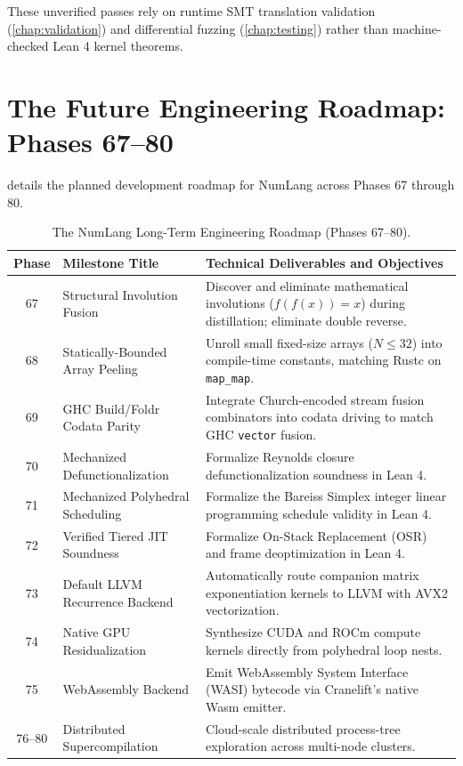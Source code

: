 These unverified passes rely on runtime SMT translation validation (\cref{chap:validation}) and differential fuzzing (\cref{chap:testing}) rather than machine-checked Lean 4 kernel theorems.

\section{The Future Engineering Roadmap: Phases 67--80}
\label{sec:lim:roadmap}

 details the planned development roadmap for NumLang across Phases 67 through 80.

\begin{table}[htbp]
\centering
\small
\begin{tabular}{clp{9cm}}
\toprule
\textbf{Phase} & \textbf{Milestone Title} & \textbf{Technical Deliverables and Objectives} \\
\midrule
67 & Structural Involution Fusion & Discover and eliminate mathematical involutions ($f(f(x)) = x$) during distillation; eliminate double reverse. \\
68 & Statically-Bounded Array Peeling & Unroll small fixed-size arrays ($N \le 32$) into compile-time constants, matching Rustc on \texttt{map\_map}. \\
69 & GHC Build/Foldr Codata Parity & Integrate Church-encoded stream fusion combinators into codata driving to match GHC \texttt{vector} fusion. \\
70 & Mechanized Defunctionalization & Formalize Reynolds closure defunctionalization soundness in Lean 4. \\
71 & Mechanized Polyhedral Scheduling & Formalize the Bareiss Simplex integer linear programming schedule validity in Lean 4. \\
72 & Verified Tiered JIT Soundness & Formalize On-Stack Replacement (OSR) and frame deoptimization in Lean 4. \\
73 & Default LLVM Recurrence Backend & Automatically route companion matrix exponentiation kernels to LLVM with AVX2 vectorization. \\
74 & Native GPU Residualization & Synthesize CUDA and ROCm compute kernels directly from polyhedral loop nests. \\
75 & WebAssembly Backend & Emit WebAssembly System Interface (WASI) bytecode via Cranelift's native Wasm emitter. \\
76--80 & Distributed Supercompilation & Cloud-scale distributed process-tree exploration across multi-node clusters. \\
\bottomrule
\end{tabular}
\caption{The NumLang Long-Term Engineering Roadmap (Phases 67--80).}
\label{tab:roadmap_future}
\end{table}


